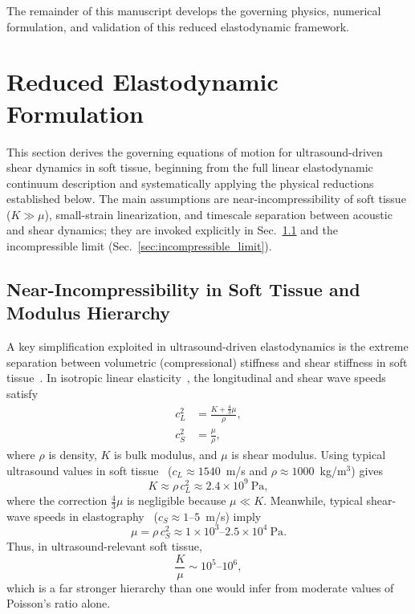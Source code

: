 \documentclass[11pt]{article}
\begin{document}
The remainder of this manuscript develops the governing physics, numerical
formulation, and validation of this reduced elastodynamic framework.

\section{Reduced Elastodynamic Formulation}
\label{sec:reduced_model}

This section derives the governing equations of motion for ultrasound-driven
shear dynamics in soft tissue, beginning from the full linear elastodynamic
continuum description and systematically applying the physical reductions
established below. The main assumptions are near-incompressibility of soft
tissue ($K \gg \mu$), small-strain linearization, and timescale separation
between acoustic and shear dynamics; they are invoked explicitly in
Sec.~\ref{sec:near_incompressible} and the incompressible limit
(Sec.~\ref{sec:incompressible_limit}).
\label{sec:assumptions}

\subsection{Near-Incompressibility in Soft Tissue and Modulus Hierarchy}
\label{sec:near_incompressible}

A key simplification exploited in ultrasound-driven elastodynamics is the extreme
separation between volumetric (compressional) stiffness and shear stiffness in
soft tissue~\cite{fung1993biomechanics,duck1990physical}. In isotropic linear elasticity~\cite{auld1973acoustic,graff1991wave,achenbach1973wave}, the longitudinal and shear wave
speeds satisfy
\begin{align}
c_L^2 &= \frac{K+\frac{4}{3}\mu}{\rho},\\
c_S^2 &= \frac{\mu}{\rho},
\end{align}
where $\rho$ is density, $K$ is bulk modulus, and $\mu$ is shear modulus. Using
typical ultrasound values in soft tissue~\cite{duck1990physical} ($c_L \approx 1540$~m/s and
$\rho \approx 1000$~kg/m$^3$) gives
\begin{equation}
K \approx \rho\,c_L^2 \approx 2.4\times 10^{9}\ \text{Pa},
\end{equation}
where the correction $\frac{4}{3}\mu$ is negligible because $\mu \ll K$.
Meanwhile, typical shear-wave speeds in elastography~\cite{sandrin2003transient,barr2015elastography} ($c_S \approx 1$--$5$~m/s)
imply
\begin{equation}
\mu = \rho\,c_S^2 \approx 1\times 10^{3}\text{--}2.5\times 10^{4}\ \text{Pa}.
\end{equation}
Thus, in ultrasound-relevant soft tissue,
\begin{equation}
\frac{K}{\mu} \sim 10^{5}\text{--}10^{6},
\end{equation}
which is a far stronger hierarchy than one would infer from moderate values of
Poisson's ratio alone.
\end{document}
